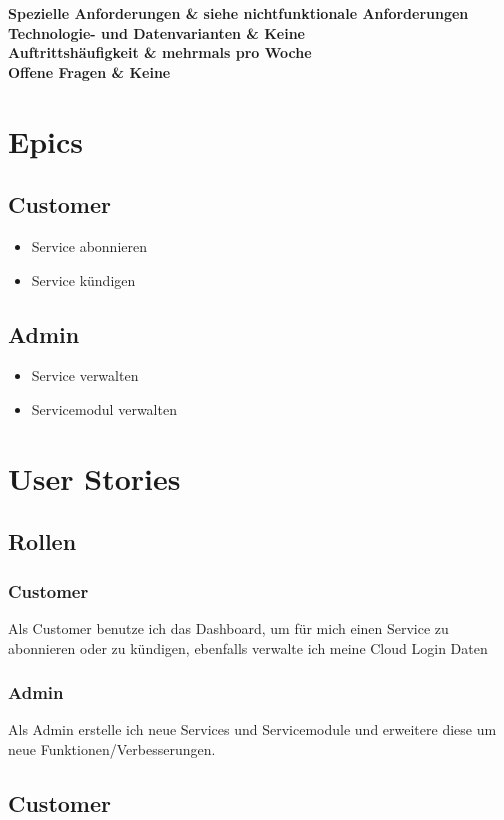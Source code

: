 \documentclass[11pt]{scrartcl}
\begin{document}
\begin{longtabu}
	\bfseries Spezielle Anforderungen & siehe nichtfunktionale Anforderungen  \\\hline 
	\bfseries Technologie- und Datenvarianten & Keine  \\\hline 
	\bfseries Auftrittshäufigkeit & mehrmals pro Woche  \\\hline 
	\bfseries Offene Fragen & Keine  \\\hline  
\end{longtabu}


\newpage
\section{Epics}
\subsection{Customer}
\begin{itemize}
  \item Service abonnieren
  \item Service kündigen
\end{itemize}
\subsection{Admin}
\begin{itemize}
  \item Service verwalten
  \item Servicemodul verwalten
\end{itemize}
\section{User Stories}
\subsection{Rollen}
\subsubsection{Customer}
Als Customer benutze ich das Dashboard, um für mich einen Service zu abonnieren oder zu 
kündigen, ebenfalls verwalte ich meine Cloud Login Daten
\subsubsection{Admin}
Als Admin erstelle ich neue Services und Servicemodule und erweitere diese um 
neue Funktionen/Verbesserungen.
\subsection{Customer}
\end{document}
